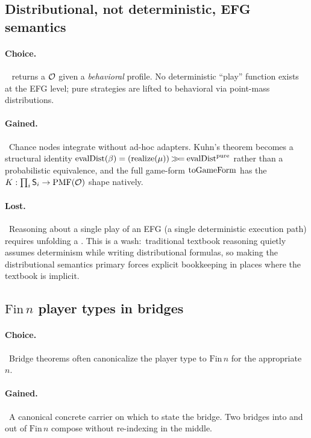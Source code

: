 \subsection{Distributional, not deterministic, EFG semantics}
\label{sec:discussion:efg-distributional}

\paragraph{Choice.}\  returns a 
$\mathcal{O}$ given a \emph{behavioral} profile.  No deterministic
``play'' function exists at the EFG level; pure strategies are
lifted to behavioral via point-mass distributions.

\paragraph{Gained.}\ Chance nodes integrate without ad-hoc
adapters.  Kuhn's theorem becomes a structural identity
$\mathrm{evalDist}(\beta) = (\mathrm{realize}(\mu)) \mathbin{\mathbin{\gg\!=}}
\mathrm{evalDist}^{\mathrm{pure}}$ rather than a probabilistic
equivalence, and the full game-form $\mathrm{toGameForm}$ has the
$K : \prod_i \mathsf{S}_i \to \mathrm{PMF}(\mathcal{O})$ shape natively.

\paragraph{Lost.}\ Reasoning about a single play of an EFG (a
single deterministic execution path) requires unfolding a
.  This is a wash:\ traditional textbook reasoning quietly
assumes determinism while writing distributional formulas, so
making the distributional semantics primary forces explicit
bookkeeping in places where the textbook is implicit.

\subsection{\texorpdfstring{$\mathrm{Fin}\,n$}{Fin n} player types in bridges}
\label{sec:discussion:fin-n}

\paragraph{Choice.}\ Bridge theorems often canonicalize the
player type to $\mathrm{Fin}\,n$ for the appropriate $n$.

\paragraph{Gained.}\ A canonical concrete carrier on which to
state the bridge.  Two bridges into and out of $\mathrm{Fin}\,n$
compose without re-indexing in the middle.

